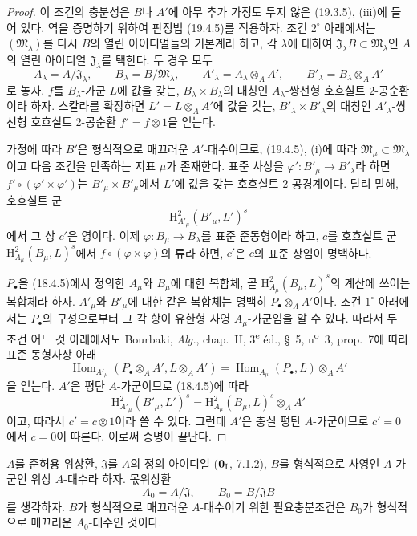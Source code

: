\begin{proof}
이 조건의 충분성은 $B$나 $A'$에 아무 추가 가정도 두지 않은
(19.3.5), (iii)에 들어 있다. 역을 증명하기 위하여 판정법
(19.4.5)를 적용하자. 조건 $2^\circ$ 아래에서는
$(\mathfrak M_\lambda)$를 다시 $B$의 열린 아이디얼들의 기본계라
하고, 각 $\lambda$에 대하여
$\mathfrak J_\lambda B\subset\mathfrak M_\lambda$인 $A$의
열린 아이디얼 $\mathfrak J_\lambda$를 택한다. 두 경우 모두
\[
  A_\lambda=A/\mathfrak J_\lambda,\qquad
  B_\lambda=B/\mathfrak M_\lambda,\qquad
  A'_\lambda=A_\lambda\otimes_A A',\qquad
  B'_\lambda=B_\lambda\otimes_A A'
\]
로 놓자. $f$를 $B_\lambda$-가군 $L$에 값을 갖는,
$B_\lambda\times B_\lambda$의 대칭인
$A_\lambda$-쌍선형 호흐실트 $2$-공순환이라 하자. 스칼라를
확장하면 $L'=L\otimes_A A'$에 값을 갖는,
$B'_\lambda\times B'_\lambda$의 대칭인
$A'_\lambda$-쌍선형 호흐실트 $2$-공순환
$f'=f\otimes1$을 얻는다.

가정에 따라 $B'$은 형식적으로 매끄러운 $A'$-대수이므로,
(19.4.5), (i)에 따라
$\mathfrak M_\mu\subset\mathfrak M_\lambda$이고 다음 조건을
만족하는 지표 $\mu$가 존재한다. 표준 사상을
$\varphi':B'_\mu\to B'_\lambda$라 하면
$f'\circ(\varphi'\times\varphi')$는
$B'_\mu\times B'_\mu$에서 $L'$에 값을 갖는 호흐실트
$2$-공경계이다. 달리 말해, 호흐실트 군
\[
  \mathrm H^2_{A'_\mu}(B'_\mu,L')^s
\]
에서 그 상 $c'$은 영이다. 이제
$\varphi:B_\mu\to B_\lambda$를 표준 준동형이라 하고,
$c$를 호흐실트 군
$\mathrm H^2_{A_\mu}(B_\mu,L)^s$에서
$f\circ(\varphi\times\varphi)$의 류라 하면, $c'$은 $c$의 표준
상임이 명백하다.

$P_\bullet$을 (18.4.5)에서 정의한 $A_\mu$와 $B_\mu$에 대한
복합체, 곧 $\mathrm H^2_{A_\mu}(B_\mu,L)^s$의 계산에 쓰이는
복합체라 하자. $A'_\mu$와 $B'_\mu$에 대한 같은 복합체는
명백히 $P_\bullet\otimes_A A'$이다. 조건 $1^\circ$ 아래에서는
$P_\bullet$의 구성으로부터 그 각 항이 유한형 사영
$A_\mu$-가군임을 알 수 있다. 따라서 두 조건 어느 것 아래에서도
Bourbaki, \emph{Alg.}, chap.~II, 3\textsuperscript{e} éd., §~5,
n\textsuperscript{o}~3, prop.~7에 따라 표준 동형사상 아래
\[
  \operatorname{Hom}_{A'_\mu}(P_\bullet\otimes_A A',
  L\otimes_A A')
  =
  \operatorname{Hom}_{A_\mu}(P_\bullet,L)\otimes_A A'
\]
을 얻는다. $A'$은 평탄 $A$-가군이므로 (18.4.5)에 따라
\[
  \mathrm H^2_{A'_\mu}(B'_\mu,L')^s
  =
  \mathrm H^2_{A_\mu}(B_\mu,L)^s\otimes_A A'
\]
이고, 따라서 $c'=c\otimes1$이라 쓸 수 있다. 그런데 $A'$은 충실
평탄 $A$-가군이므로 $c'=0$에서 $c=0$이 따른다. 이로써 증명이
끝난다.
\end{proof}

\begin{proposition}[19.4.7]
\label{0.19.4.7-fr}
$A$를 준허용 위상환, $\mathfrak J$를 $A$의 정의 아이디얼
($\mathbf 0_{\rm I}$, 7.1.2), $B$를 형식적으로 사영인
$A$-가군인 위상 $A$-대수라 하자. 몫위상환
\[
  A_0=A/\mathfrak J,\qquad B_0=B/\mathfrak JB
\]
를 생각하자. $B$가 형식적으로 매끄러운 $A$-대수이기 위한
필요충분조건은 $B_0$가 형식적으로 매끄러운 $A_0$-대수인 것이다.
\end{proposition}

